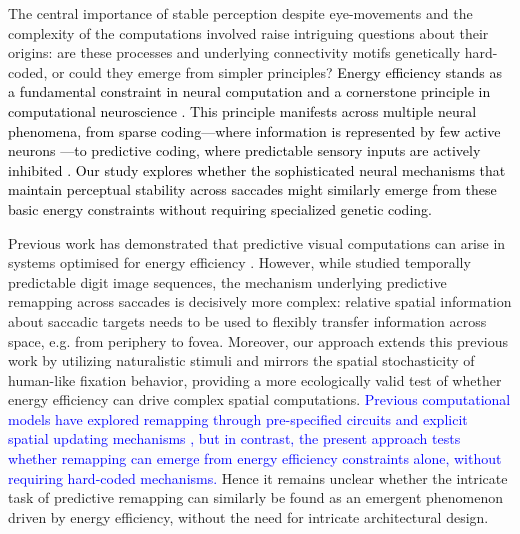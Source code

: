 \documentclass[10pt,letterpaper]{article}
\begin{document}
The central importance of stable perception despite eye-movements and the complexity of the computations involved raise intriguing questions about their origins: are these processes and underlying connectivity motifs genetically hard-coded, or could they emerge from simpler principles? \textcolor{black}{Energy efficiency stands as a fundamental constraint in neural computation and a cornerstone principle in computational neuroscience \citep{lennie2003cost, sterling2015principles}. This principle manifests across multiple neural phenomena, from sparse coding—where information is represented by few active neurons \citep{olshausen1996emergence}—to predictive coding, where predictable sensory inputs are actively inhibited \citep{rao1999predictive, friston2005theory}. Our study explores whether the sophisticated neural mechanisms that maintain perceptual stability across saccades might similarly emerge from these basic energy constraints without requiring specialized genetic coding.}


Previous work has demonstrated that predictive visual computations can arise in systems 
optimised for energy efficiency \citep{ali_predictive_2022}. However, while 
\citet{ali_predictive_2022} studied temporally predictable digit image sequences, 
the mechanism underlying predictive remapping across saccades is decisively more complex: 
relative spatial information about saccadic targets needs to be used to flexibly 
transfer information across space, e.g. from periphery to fovea. Moreover, our approach 
extends this previous work by utilizing naturalistic stimuli and mirrors the spatial 
stochasticity of human-like fixation behavior, providing a more ecologically valid test 
of whether energy efficiency can drive complex spatial computations. \textcolor{blue}{Previous computational 
models have explored remapping through pre-specified circuits \citep{rao_circuits_2016} 
and explicit spatial updating mechanisms \citep{bergelt_spatial_2019}, but in contrast, 
the present approach tests whether remapping can emerge from energy efficiency constraints 
alone, without requiring hard-coded mechanisms.} Hence it remains unclear whether the 
intricate task of predictive remapping can similarly be found as an emergent phenomenon 
driven by energy efficiency, without the need for intricate architectural design.
\end{document}
